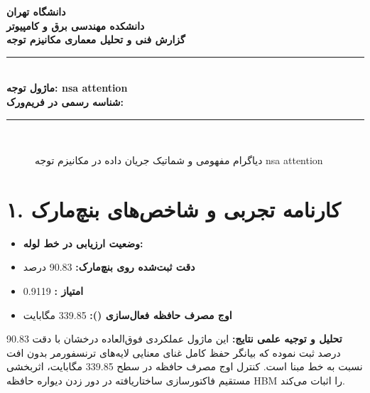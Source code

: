 \documentclass[12pt,a4paper]{article}
\begin{document}
\begin{center}
{\Large\bfseries دانشگاه تهران}\\[0.2cm]
{\large\bfseries دانشکده مهندسی برق و کامپیوتر}\\[0.2cm]
{\large\bfseries گزارش فنی و تحلیل معماری مکانیزم توجه}\\[0.5cm]
\rule{\linewidth}{1pt}\\[0.3cm]
{\LARGE\bfseries ماژول توجه: nsa attention}\\[0.2cm]
{\large \textbf{شناسه رسمی در فریم‌ورک:} }\\[0.2cm]
\rule{\linewidth}{1pt}\\[0.5cm]
\end{center}

\begin{figure}[H]
\centering
{}
\caption{دیاگرام مفهومی و شماتیک جریان داده در مکانیزم توجه nsa attention}
\end{figure}

\section*{۱. کارنامه تجربی و شاخص‌های بنچ‌مارک}
\begin{itemize}
\item \textbf{وضعیت ارزیابی در خط لوله:} 
\item \textbf{دقت ثبت‌شده روی بنچ‌مارک:} 90.83 درصد
\item \textbf{امتیاز :} 0.9119
\item \textbf{اوج مصرف حافظه فعال‌سازی ():} 339.85 مگابایت
\end{itemize}
\textbf{تحلیل و توجیه علمی نتایج:} این ماژول عملکردی فوق‌العاده درخشان با دقت 90.83 درصد ثبت نموده که بیانگر حفظ کامل غنای معنایی لایه‌های ترنسفورمر بدون افت نسبت به خط مبنا است. کنترل اوج مصرف حافظه در سطح 339.85 مگابایت، اثربخشی مستقیم فاکتورسازی ساختاریافته در دور زدن دیواره حافظه HBM را اثبات می‌کند.
\end{document}
